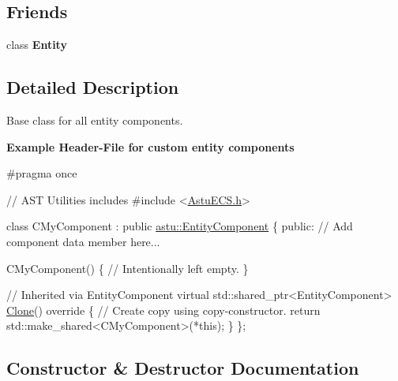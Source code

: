 \subsection*{Friends}
\begin{DoxyCompactItemize}
\item 
\mbox{\label{classastu_1_1EntityComponent_a614439ccac0344926adc4c0165d64060}} 
class {\bfseries Entity}
\end{DoxyCompactItemize}


\subsection{Detailed Description}
Base class for all entity components.

{\bfseries Example Header-\/\+File for custom entity components} 
\begin{DoxyCodeInclude}
\textcolor{preprocessor}{#pragma once}

\textcolor{comment}{// AST Utilities includes}
\textcolor{preprocessor}{#include <\hyperlink{AstuECS_8h}{AstuECS.h}>}

\textcolor{keyword}{class }CMyComponent : \textcolor{keyword}{public} \hyperlink{classastu_1_1EntityComponent}{astu::EntityComponent} \{
\textcolor{keyword}{public}: 
    \textcolor{comment}{// Add component data member here...}

    CMyComponent() \{
        \textcolor{comment}{// Intentionally left empty.        }
    \}

    \textcolor{comment}{// Inherited via EntityComponent}
    \textcolor{keyword}{virtual} std::shared\_ptr<EntityComponent> \hyperlink{classastu_1_1EntityComponent_afeddb5a899d831255a9a4f07269f3b2d}{Clone}()\textcolor{keyword}{ override }\{
        \textcolor{comment}{// Create copy using copy-constructor.}
        \textcolor{keywordflow}{return} std::make\_shared<CMyComponent>(*this);
    \}    
\};
\end{DoxyCodeInclude}
 

\subsection{Constructor \& Destructor Documentation}
\mbox{\label{classastu_1_1EntityComponent_a9bb95d7ddc55093fd86e04d5b6aa98ec}} 
